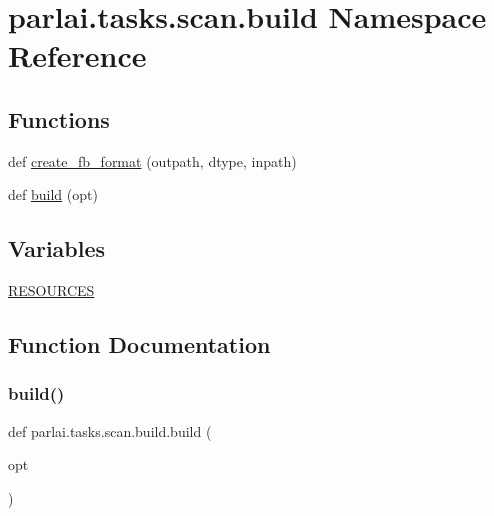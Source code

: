 \hypertarget{namespaceparlai_1_1tasks_1_1scan_1_1build}{}\section{parlai.\+tasks.\+scan.\+build Namespace Reference}
\label{namespaceparlai_1_1tasks_1_1scan_1_1build}
\subsection*{Functions}
\begin{DoxyCompactItemize}
\item 
def \hyperlink{namespaceparlai_1_1tasks_1_1scan_1_1build_acd920598e2932f5f8db51dcf6e25a00c}{create\+\_\+fb\+\_\+format} (outpath, dtype, inpath)
\item 
def \hyperlink{namespaceparlai_1_1tasks_1_1scan_1_1build_ad191bbde08667e24f385a91cb8bd235a}{build} (opt)
\end{DoxyCompactItemize}
\subsection*{Variables}
\begin{DoxyCompactItemize}
\item 
\hyperlink{namespaceparlai_1_1tasks_1_1scan_1_1build_ac22a9947f9679ca337ee812a9afb6fca}{R\+E\+S\+O\+U\+R\+C\+ES}
\end{DoxyCompactItemize}


\subsection{Function Documentation}
\mbox{\label{namespaceparlai_1_1tasks_1_1scan_1_1build_ad191bbde08667e24f385a91cb8bd235a}} 
\subsubsection{\texorpdfstring{build()}{build()}}
{\footnotesize\ttfamily def parlai.\+tasks.\+scan.\+build.\+build (\begin{DoxyParamCaption}\item[{}]{opt }\end{DoxyParamCaption})}



